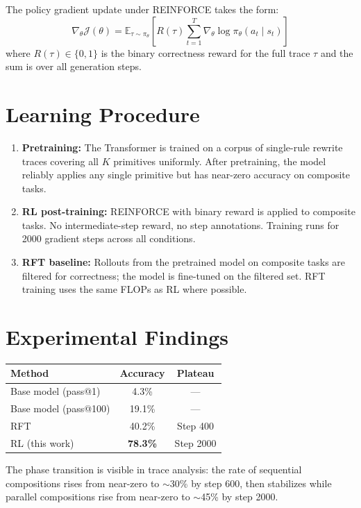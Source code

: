 \documentclass[10pt,twocolumn]{article}
\begin{document}
The policy gradient update under REINFORCE takes the form:
\[
\nabla_\theta \mathcal{J}(\theta)
= \mathbb{E}_{\tau \sim \pi_\theta}
  \left[ R(\tau) \sum_{t=1}^{T} \nabla_\theta \log \pi_\theta(a_t \mid s_t) \right]
\]
where $R(\tau) \in \{0,1\}$ is the binary correctness reward for
the full trace $\tau$ and the sum is over all generation steps.

\section{Learning Procedure}

\begin{enumerate}[itemsep=2pt,parsep=0pt]
  \item \textbf{Pretraining:} The Transformer is trained on a corpus
    of single-rule rewrite traces covering all $K$ primitives uniformly.
    After pretraining, the model reliably applies any single primitive
    but has near-zero accuracy on composite tasks.
  \item \textbf{RL post-training:} REINFORCE with binary reward is
    applied to composite tasks.
    No intermediate-step reward, no step annotations.
    Training runs for 2000 gradient steps across all conditions.
  \item \textbf{RFT baseline:} Rollouts from the pretrained model on
    composite tasks are filtered for correctness; the model is fine-tuned
    on the filtered set.
    RFT training uses the same FLOPs as RL where possible.
\end{enumerate}

\section{Experimental Findings}

\begin{center}
\small
\begin{tabular}{lcc}
\toprule
Method & Accuracy & Plateau \\
\midrule
Base model (pass@1) & 4.3\% & --- \\
Base model (pass@100) & 19.1\% & --- \\
RFT & 40.2\% & Step 400 \\
RL (this work) & \textbf{78.3\%} & Step 2000 \\
\bottomrule
\end{tabular}
\end{center}

The phase transition is visible in trace analysis: the rate of
sequential compositions rises from near-zero to $\sim$30\% by
step 600, then stabilizes while parallel compositions rise from
near-zero to $\sim$45\% by step 2000.
\end{document}
